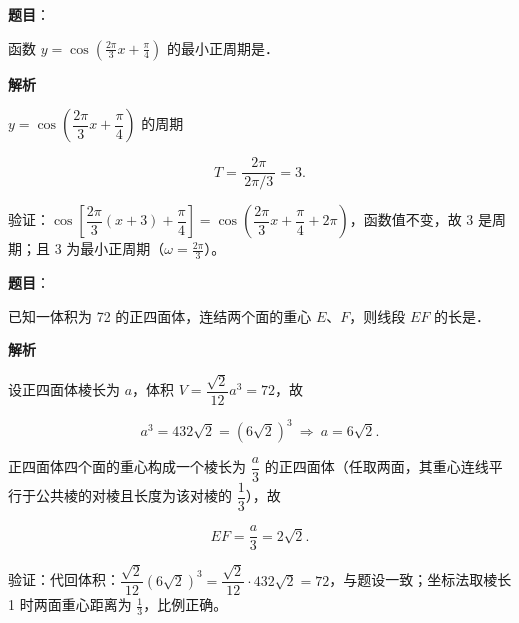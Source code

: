 \begin{answer}

\textbf{题目}：

函数 $y = \cos\left(\frac{2\pi}{3}x + \frac{\pi}{4}\right)$ 的最小正周期是\gkblank{}．

\textbf{解析}

$y=\cos\!\left(\dfrac{2\pi}{3}x+\dfrac\pi4\right)$ 的周期

\nopagebreak[4]
\[T=\frac{2\pi}{\,2\pi/3\,}=3 .\]

验证：$\cos\!\left[\dfrac{2\pi}{3}(x+3)+\dfrac\pi4\right]=\cos\!\left(\dfrac{2\pi}{3}x+\dfrac\pi4+2\pi\right)$，函数值不变，故 3 是周期；且 $3$ 为最小正周期（$\omega=\tfrac{2\pi}{3}$）。


\par\medskip

\end{answer}
\begin{answer}

\textbf{题目}：

已知一体积为 72 的正四面体，连结两个面的重心 $E$、$F$，则线段 $EF$ 的长是\gkblank{}．

\textbf{解析}

设正四面体棱长为 $a$，体积 $V=\dfrac{\sqrt2}{12}a^3=72$，故

\nopagebreak[4]
\[a^3=432\sqrt2=(6\sqrt2)^3\ \Longrightarrow\ a=6\sqrt2 .\]

正四面体四个面的重心构成一个棱长为 $\dfrac a3$ 的正四面体（任取两面，其重心连线平行于公共棱的对棱且长度为该对棱的 $\dfrac13$），故

\nopagebreak[4]
\[EF=\frac a3=2\sqrt2 .\]

验证：代回体积：$\dfrac{\sqrt2}{12}(6\sqrt2)^3=\dfrac{\sqrt2}{12}\cdot432\sqrt2=72$，与题设一致；坐标法取棱长 1 时两面重心距离为 $\tfrac13$，比例正确。


\par\medskip

\end{answer}
